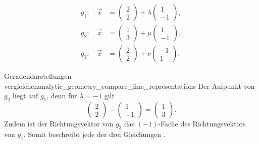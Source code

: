 \[
  \begin{aligned}
    g_1:\quad \vec x&=\begin{pmatrix}2\\2\end{pmatrix}
      +\lambda\begin{pmatrix}1\\-1\end{pmatrix},\\[0.7em]
    g_2:\quad \vec x&=\begin{pmatrix}1\\3\end{pmatrix}
      +\mu\begin{pmatrix}1\\-1\end{pmatrix},\\[0.7em]
    g_3:\quad \vec x&=\begin{pmatrix}2\\2\end{pmatrix}
      +\nu\begin{pmatrix}-1\\1\end{pmatrix}.
  \end{aligned}
\]

\begin{ExampleBox}{Geradendarstellungen vergleichen}{analytic_geometry_compare_line_representations}
  Der Aufpunkt von $g_2$ liegt auf $g_1$, denn für $\lambda=-1$ gilt
  \[
    \begin{pmatrix}2\\2\end{pmatrix}
    -\begin{pmatrix}1\\-1\end{pmatrix}
    =\begin{pmatrix}1\\3\end{pmatrix}.
  \]
  Zudem ist der Richtungsvektor von $g_3$ das $(-1)$-Fache des
  Richtungsvektors von $g_1$. Somit beschreibt jede der drei Gleichungen
  .
\end{ExampleBox}
